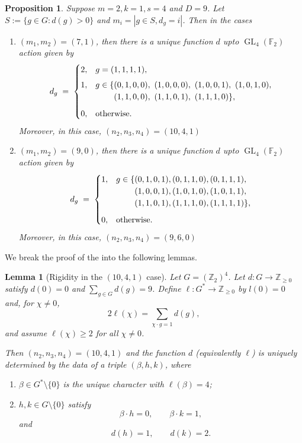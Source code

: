\documentclass[12pt,twoside,]{amsart}
\theoremstyle{plain}
\newtheorem{lemma}[theorem]{Lemma}
\newtheorem{proposition}[theorem]{Proposition}
\theoremstyle{definition}
\begin{document}
\begin{proposition}\label{m = 2; k = 1; D = 9 possibility}
Suppose $m = 2, k = 1, s = 4$ and $D = 9$. Let $S:=\{g\in G : d(g)>0\}$ and $m_i = | g \in S, d_g = i|$.  Then in the cases 
\begin{enumerate}
    \item $(m_1, m_2) = (7,1)$, then there is a unique function $d$ upto $\operatorname{GL}_4(\mathbb{F}_2)$ action given by 
    \[
d_g \;=\;
\begin{cases}
2, & g=(1,1,1,1),\\[4pt]
1, & g\in\{(0,1,0,0),\ (1,0,0,0),\ (1,0,0,1),\ (1,0,1,0),\\
   & \hphantom{g\in\{} (1,1,0,0),\ (1,1,0,1),\ (1,1,1,0)\},\\[6pt]
0, & \text{otherwise.}
\end{cases}
\]
Moreover, in this case, $(n_2, n_3, n_4) = (10, 4, 1)$
    \item $(m_1, m_2) = (9,0)$, then there is a unique function $d$ upto $\operatorname{GL}_4(\mathbb{F}_2)$ action given by 
    \[
d_g \;=\;
\begin{cases}
1, & g\in\{(0,1,0,1),(0,1,1,0),(0,1,1,1),\\
   & \hphantom{g\in\{} (1,0,0,1),(1,0,1,0),(1,0,1,1),\\
   & \hphantom{g\in\{} (1,1,0,1),(1,1,1,0),(1,1,1,1)\},\\[6pt]
0, & \text{otherwise.}
\end{cases}
\]
Moreover, in this case, $(n_2, n_3, n_4) = (9, 6, 0)$

\end{enumerate}   
\end{proposition}

We break the proof of the  into the following lemmas.


\begin{lemma}[Rigidity in the $(10,4,1)$ case]
Let $G=(\mathbb Z_2)^4$.  Let $d:G\to\mathbb Z_{\ge0}$ satisfy $d(0)=0$ and
$\sum_{g\in G} d(g)=9$.  Define $\ell:G^*\to\mathbb Z_{\ge0}$ by $l(0)=0$ and, for
$\chi\neq0$,
\[
2\ell(\chi)=\sum_{\chi\cdot g=1} d(g),
\]
and assume $\ell(\chi) \ge 2$ for all $\chi\neq0$.  

Then $(n_2,n_3,n_4) = (10,4,1)$ and
the function $d$ (equivalently $\ell$) is uniquely determined by the data of a
triple $(\beta,h,k)$, where
\begin{enumerate}
\item $\beta\in G^*\setminus\{0\}$ is the unique character with $\ell(\beta)=4$;
\item $h,k\in G\setminus\{0\}$ satisfy
\[
\beta\cdot h=0,\qquad \beta\cdot k=1,
\]
and
\[
d(h)=1,\qquad d(k)=2.
\]
\end{enumerate}
\end{lemma}
\end{document}
